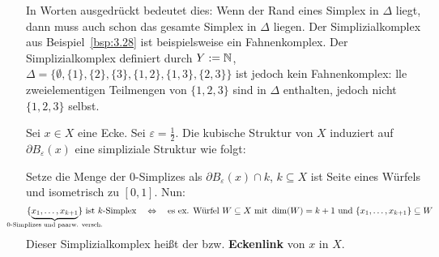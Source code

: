 In Worten ausgedrückt bedeutet dies:
Wenn der Rand eines Simplex in $\Delta$ liegt, dann muss auch schon das gesamte Simplex in $\Delta$ liegen.
Der Simplizialkomplex aus Beispiel~\ref{bsp:3.28} ist beispielsweise ein Fahnenkomplex.
Der Simplizialkomplex definiert durch $Y:=\mathbb{N}$, $\Delta = \{\emptyset,\{1\},\{2\},\{3\},\{1,2\},\{1,3\},\{2,3\}\}$ ist jedoch kein Fahnenkomplex:
lle zweielementigen Teilmengen von $\{1,2,3\}$ sind in $\Delta$ enthalten, jedoch nicht $\{1,2,3\}$ selbst.
 
\begin{definition}
	\label{def:3.30}
	Sei $x \in X$ eine Ecke.
	Sei $\varepsilon = \frac{1}{2}$.
	Die kubische Struktur von $X$ induziert auf $\partial B_\varepsilon(x)$ eine simpliziale Struktur wie folgt:
	
	Setze die Menge der $0$-Simplizes als $\partial B_\varepsilon(x) \cap k$, $k \subseteq X$ ist Seite eines Würfels und isometrisch zu $[0,1]$.
	Nun:
	\[
		\{\Underbrace{x_1,\dots,x_{k+1}}{\mathclap{\text{0-Simplizes und paarw. versch.}}}\} \text{ ist } k \text{-Simplex} \quad \Leftrightarrow \quad \text{es ex. Würfel } W \subseteq X \text{ mit } \dim(W) = k+1 \text{ und } \{x_1,\dots,x_{k+1}\} \subseteq W
	\]
	Dieser Simplizialkomplex heißt der  bzw. \textbf{Eckenlink} von $x$ in $X$.
\end{definition}

